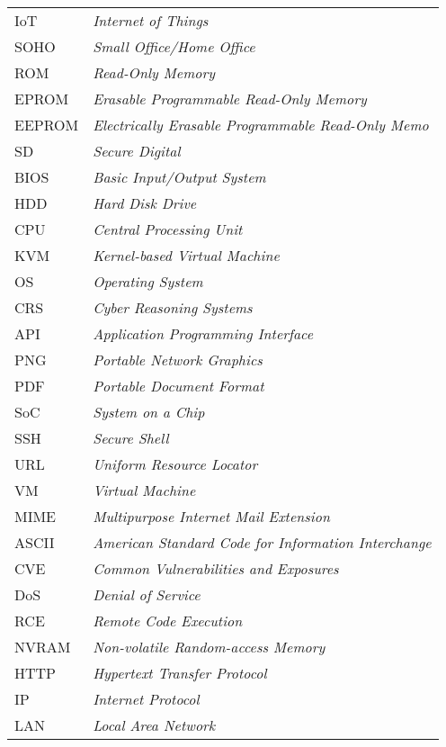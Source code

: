 \begin{longtable}{ll}
  IoT & \textit{Internet of Things} \\
  SOHO & \textit{Small Office/Home Office} \\
  ROM & \textit{Read-Only Memory} \\
  EPROM & \textit{Erasable Programmable Read-Only Memory} \\
  EEPROM & \textit{Electrically Erasable Programmable Read-Only Memo} \\
  SD & \textit{Secure Digital} \\
  BIOS & \textit{Basic Input/Output System} \\
  HDD & \textit{Hard Disk Drive} \\
  CPU & \textit{Central Processing Unit} \\
  KVM & \textit{Kernel-based Virtual Machine} \\
  OS & \textit{Operating System} \\
  CRS & \textit{Cyber Reasoning Systems} \\
  API & \textit{Application Programming Interface} \\
  PNG & \textit{Portable Network Graphics} \\
  PDF & \textit{Portable Document Format} \\
  SoC & \textit{System on a Chip} \\
  SSH & \textit{Secure Shell} \\
  URL & \textit{Uniform Resource Locator} \\
  VM & \textit{Virtual Machine} \\
  MIME & \textit{Multipurpose Internet Mail Extension} \\
  ASCII & \textit{American Standard Code for Information Interchange} \\
  CVE & \textit{Common Vulnerabilities and Exposures} \\
  DoS & \textit{Denial of Service} \\
  RCE & \textit{Remote Code Execution} \\
  NVRAM & \textit{Non-volatile Random-access Memory} \\
  HTTP & \textit{Hypertext Transfer Protocol} \\
  IP & \textit{Internet Protocol} \\
  LAN & \textit{Local Area Network} \\
\end{longtable}

